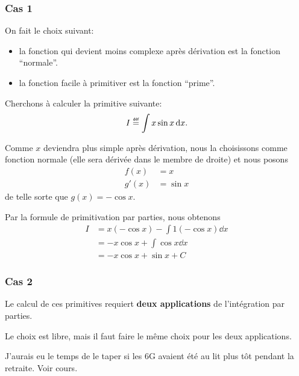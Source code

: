 \documentclass[main.tex]{subfiles}
\begin{document}
\subsubsection{Cas 1}

On fait le choix suivant:

\begin{itemize}
    \item la fonction qui devient moins complexe après dérivation est la fonction ``normale''.
    \item la fonction facile à primitiver est la fonction ``prime''.
\end{itemize}

\begin{example}
    Cherchons à calculer la primitive suivante:
    \begin{align}
        I \defeq \int x \sin x \dd x.
    \end{align}

    Comme $x$ deviendra plus simple après dérivation,
    nous la choisissons comme fonction normale
    (elle sera dérivée dans le membre de droite)
    et nous posons
    \begin{align}
        f(x) &= x\\
        g'(x) &= \sin x
    \end{align}
    de telle sorte que $g(x) = -\cos x$.

    Par la formule de primitivation par parties,
    nous obtenons
    \begin{align}
        I &= x (-\cos x) - \int 1 (-\cos x) \dd x\\
          &= -x \cos x + \int \cos x \dd x\\
          &= -x \cos x + \sin x + C
    \end{align}
\end{example}

\subsubsection{Cas 2}

Le calcul de ces primitives requiert \textbf{deux applications} de l'intégration par parties.

Le choix est libre,
mais il faut faire le même choix pour les deux applications.

\begin{example}
    J'aurais eu le temps de le taper si les 6G avaient été au lit plus tôt pendant la retraite.
    Voir cours.
\end{example}
\end{document}
